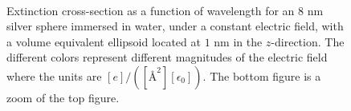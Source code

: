 \begin{figure}%
    \centering
    \\
    \caption{Extinction cross-section as a function of wavelength for an $8$ nm
    silver sphere immersed in water, under a constant electric field, with a volume equivalent ellipsoid
    located at $1$ nm in the $z$-direction. The different colors represent different magnitudes of the 
    electric field where the units are $[e]/([{\text{\AA}}^2][\epsilon_0])$. The bottom figure is a zoom of the top 
    figure.}
    \label{fig:efield_effect}
 \end{figure}

